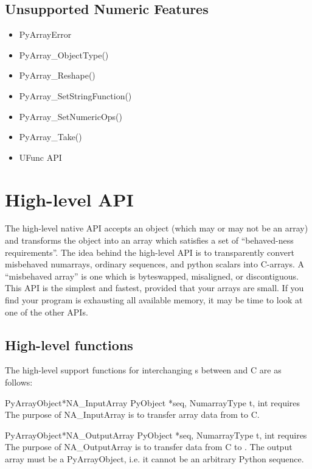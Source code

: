 \subsection{Unsupported Numeric Features}
\label{sec:C-API:compat:unsupported}

\begin{itemize}
\item PyArrayError 
\item PyArray_ObjectType() 
\item PyArray_Reshape()
\item PyArray_SetStringFunction() 
\item PyArray_SetNumericOps() 
\item PyArray_Take()
\item UFunc API
\end{itemize}

\section{High-level API}
\label{sec:C-API:high-level-api}

The high-level native API accepts an object (which may or may not be an array)
and transforms the object into an array which satisfies a set of ``behaved-ness
requirements''.  The idea behind the high-level API is to transparently convert
misbehaved numarrays, ordinary sequences, and python scalars into C-arrays.  A
``misbehaved array'' is one which is byteswapped, misaligned, or discontiguous.
This API is the simplest and fastest, provided that your arrays are small.  If
you find your program is exhausting all available memory, it may be time to
look at one of the other APIs.

\subsection{High-level functions}
\label{sec:C-API:high-level-functions}

The high-level support functions for interchanging s between
\python{} and C are as follows:

\begin{cfuncdesc}{PyArrayObject*}{NA_InputArray}{%
      PyObject *seq, NumarrayType t, int requires}
The purpose of NA_InputArray is to transfer array data from \python to C.
\end{cfuncdesc}

\begin{cfuncdesc}{PyArrayObject*}{NA_OutputArray}{%
      PyObject *seq, NumarrayType t, int requires} The purpose of
NA_OutputArray is to transfer data from C to \python.  The output array must be
a PyArrayObject, i.e. it cannot be an arbitrary Python sequence.
\end{cfuncdesc}

